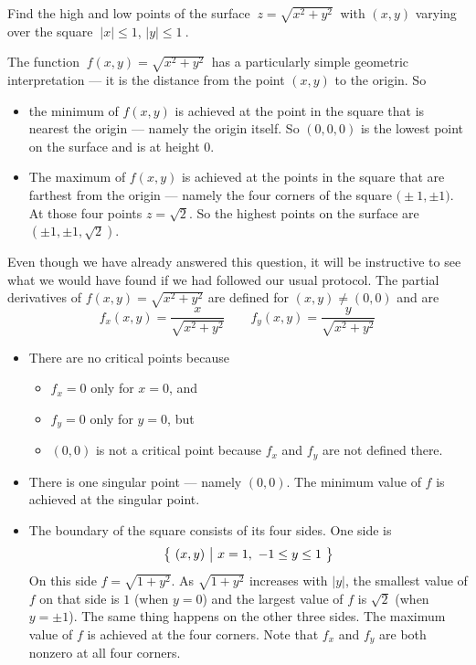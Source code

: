 \begin{eg}\label{eg:MXMNabsD}
Find the high and low points of the surface $\ z=\sqrt{x^2+y^2}\ $ with 
$(x,y)$ varying over the square $\ |x|\le 1$, $|y|\le 1\ $. 

\soln
The function $\ f(x,y)=\sqrt{x^2+y^2}\ $ has a particularly simple geometric
interpretation --- it is the distance from the point $(x,y)$ to the origin.
So
\begin{itemize}
\item 
the minimum of $f(x,y)$ is achieved at the point in the square
that is nearest the origin --- namely the origin itself. So $(0,0,0)$ 
is the lowest point on the surface and is at height $0$.
\item
The maximum of $f(x,y)$ is achieved at the points in the square
that are farthest from the origin --- namely the four corners of the
square $\big(\pm 1,\pm 1\big)$. At those four points $z=\sqrt{2}$.
So the highest points on the surface are $(\pm 1,\pm 1,\sqrt{2})$. 

\end{itemize} 
Even though we have already answered this question, it will be instructive
to see what we would have found if we had followed our usual protocol.
The partial derivatives of $f(x,y)=\sqrt{x^2+y^2}$ are defined for
$(x,y)\ne (0,0)$ and are
\begin{equation*}
f_x(x,y) =\frac{x}{\sqrt{x^2+y^2}}\qquad
f_y(x,y) =\frac{y}{\sqrt{x^2+y^2}}
\end{equation*}
\begin{itemize}
\item
There are no critical points because 
  \begin{itemize}\itemsep1pt \parskip0pt 
  \item
     $f_x=0$ only for $x=0$, and
  \item
     $f_y=0$ only for $y=0$, but
 \item
     $(0,0)$ is not a critical point because $f_x$ and $f_y$
     are not defined there.
\end{itemize}
\item
There is one singular point --- namely $(0,0)$. The
minimum value of $f$ is achieved at the singular point.

\item
The boundary of the square consists of its four sides. 
One side is 
\begin{equation*}
\big\{ \ (x,y)\ \big|\ x=1,\ -1\le y\le 1\ \big\}
\end{equation*}
On this side
$f=\sqrt{1+y^2}$. As $\sqrt{1+y^2}$ increases with $|y|$, the
smallest value of $f$ on that side is $1$ (when $y=0$) and the
largest value of $f$ is $\sqrt{2}$ (when $y=\pm 1$). The same thing
happens on the other three sides. The maximum value of $f$ is 
achieved at the four corners. Note that $f_x$ and $f_y$ are both
nonzero at all four corners.
\end{itemize}

\end{eg} 




